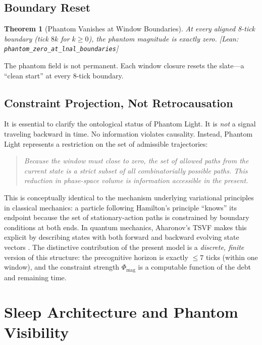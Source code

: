 \documentclass[11pt, a4paper]{article}
\newcommand{\leanref}[1]{\texttt{\small #1}}
\newtheorem{theorem}{Theorem}[section]
\theoremstyle{definition}
\theoremstyle{remark}
\begin{document}
\subsection{Boundary Reset}

\begin{theorem}[Phantom Vanishes at Window Boundaries]\label{thm:reset}
At every aligned 8-tick boundary (tick $8k$ for $k \geq 0$), the
phantom magnitude is exactly zero.
\textup{[Lean: \leanref{phantom\_zero\_at\_lnal\_boundaries}]}
\end{theorem}

The phantom field is not permanent. Each window closure resets the
slate---a ``clean start'' at every 8-tick boundary.

\subsection{Constraint Projection, Not Retrocausation}

It is essential to clarify the ontological status of Phantom Light.
It is \emph{not} a signal traveling backward in time. No information
violates causality. Instead, Phantom Light represents a restriction
on the set of admissible trajectories:

\begin{quote}
\emph{Because the window must close to zero, the set of allowed
paths from the current state is a strict subset of all
combinatorially possible paths. This reduction in phase-space volume
is information accessible in the present.}
\end{quote}

This is conceptually identical to the mechanism underlying
variational principles in classical mechanics: a particle following
Hamilton's principle ``knows'' its endpoint because the set of
stationary-action paths is constrained by boundary conditions at
both ends. In quantum mechanics, Aharonov's TSVF makes this
explicit by describing states with both forward and backward
evolving state vectors \cite{Aharonov2008}. The distinctive
contribution of the present model is a \emph{discrete, finite}
version of this structure: the precognitive horizon is exactly
$\leq 7$ ticks (within one window), and the constraint strength
$\Phi_{\mathrm{mag}}$ is a computable function of the debt and
remaining time.


\section{Sleep Architecture and Phantom Visibility}\label{sec:sleep}
\end{document}
